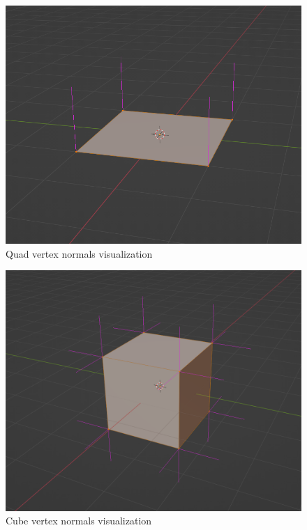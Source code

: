 \begin{figure}[ht]
    \centering
    \includegraphics[scale=0.40]{images/ChBlinnPhong/QuadVertexNormals.png}
    \caption{Quad vertex normals visualization}
    \label{fig::QuadVertexNormals}
\end{figure}

\begin{figure}[ht]
    \centering
    \includegraphics[scale=0.30]{images/ChBlinnPhong/CubeVertexNormals.png}
    \caption{Cube vertex normals visualization}
    \label{fig::CubeVertexNormals}
\end{figure}

